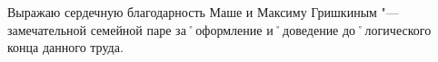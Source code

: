 ﻿
Выражаю сердечную благодарность Маше и Максиму Гришкиным "--- замечательной семейной паре за˚оформление и˚доведение до˚логического конца данного труда.